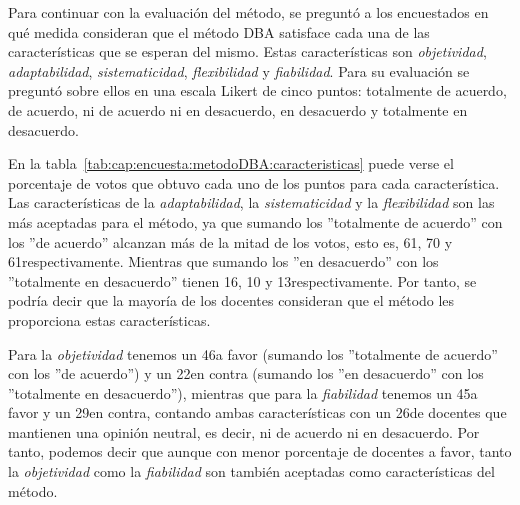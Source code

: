 Para continuar con la evaluación del método, se preguntó a los encuestados en qué medida consideran que el método DBA satisface cada una de las características que se esperan del mismo. Estas características son \emph{objetividad}, \emph{adaptabilidad}, \emph{sistematicidad}, \emph{flexibilidad} y \emph{fiabilidad}. Para su evaluación se preguntó sobre ellos en una escala Likert de cinco puntos: totalmente de acuerdo, de acuerdo, ni de acuerdo ni en desacuerdo, en desacuerdo y totalmente en desacuerdo. 

En la tabla~\ref{tab:cap:encuesta:metodoDBA:caracteristicas} puede verse el porcentaje de votos que obtuvo cada uno de los puntos para cada característica. Las características de la \emph{adaptabilidad}, la \emph{sistematicidad} y la \emph{flexibilidad} son las más aceptadas para el método, ya que sumando los ''totalmente de acuerdo'' con los ''de acuerdo'' alcanzan más de la mitad de los votos, esto es, 61, 70 y 61\percentage{ }respectivamente. Mientras que sumando los ''en desacuerdo'' con los ''totalmente en desacuerdo'' tienen 16, 10 y 13\percentage{ }respectivamente. Por tanto, se podría decir que la mayoría de los docentes consideran que el método les proporciona estas características.

Para la \emph{objetividad} tenemos un 46\percentage{ }a favor (sumando los ''totalmente de acuerdo'' con los ''de acuerdo'') y un 22\percentage{ }en contra (sumando los ''en desacuerdo'' con los ''totalmente en desacuerdo''), mientras que para la \emph{fiabilidad} tenemos un 45\percentage{ }a favor y un 29\percentage{ }en contra, contando ambas características con un 26\percentage{ }de docentes que mantienen una opinión neutral, es decir, ni de acuerdo ni en desacuerdo. Por tanto, podemos decir que aunque con menor porcentaje de docentes a favor, tanto la \emph{objetividad} como la \emph{fiabilidad} son también aceptadas como características del método.

